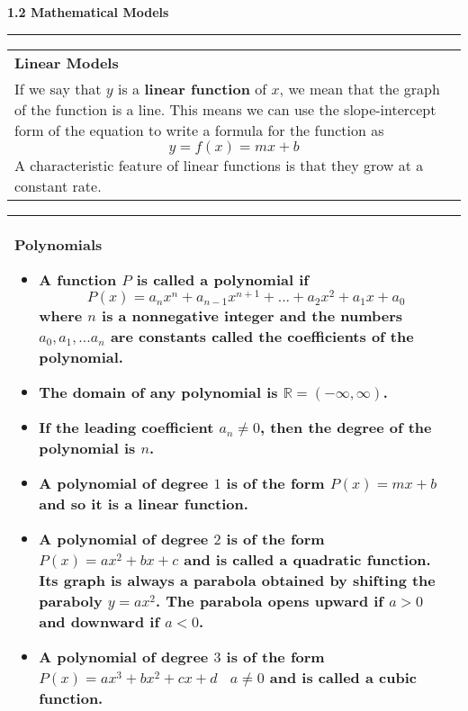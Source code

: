\documentclass[fleqn]{article}
\begin{document}
\begin{center}
{\begin{tabularx}{.9\textwidth}{|X|}
\hline
\end{tabularx}}
\vspace{36pt}	

\Large\textbf{1.2 Mathematical Models}

\noindent\hfill\rule{0.3\textwidth}{.4pt}\hfill
\vspace{12pt}

\large
\def\arraystretch{1.3}
{\setlength{\tabcolsep}{16pt}
\begin{tabularx}{.9\textwidth}{|X|}
\hline
	\vspace{1pt}
	\textbf{Linear Models} \\
	If we say that $y$ is a \textbf{linear function} of $x$, we mean that the graph of the function is a line. This means we can use the slope-intercept form of the equation to write a formula for the function as
	$$y = f(x) = mx + b$$
	A characteristic feature of linear functions is that they grow at a constant rate. \\[16pt]
\hline
\end{tabularx}}
\vspace{12pt}	

\def\arraystretch{1.3}
{\setlength{\tabcolsep}{16pt}
\begin{tabularx}{.9\textwidth}{|X|}
\hline
	\vspace{1pt}
	\textbf{Polynomials}
	\begin{itemize}
	\item A function $P$ is called a \textbf{polynomial} if
	$$P(x) = a_nx^n + a_{n-1}x^{n+1} + ... + a_2x^2 + a_1x + a_0$$
	where $n$ is a nonnegative integer and the numbers $a_0, a_1, ... a_n$ are constants called the \textbf{coefficients} of the polynomial.
	\item The domain of any polynomial is $\mathbb{R} = (-\infty, \infty)$.
	\item If the leading coefficient $a_n \ne 0$, then the \textbf{degree} of the polynomial is $n$.
	\item A polynomial of degree $1$ is of the form $P(x) = mx +b$ and so it is a \textbf{linear function}. 
	\item A polynomial of degree $2$ is of the form $P(x) = ax^2 + bx + c$ and is called a \textbf{quadratic function}. Its graph is always a parabola obtained by shifting the paraboly $y = ax^2$.  The parabola opens upward if $a>0$ and downward if $a<0$.
	\item A polynomial of degree $3$ is of the form $P(x) = ax^3 + bx^2 + cx + d \:\:\:\: a \ne 0$ and is called a \textbf{cubic function}. 
	\end{itemize} \\
\hline
\end{tabularx}}
\vspace{24pt}	


\end{center}
\end{document}
